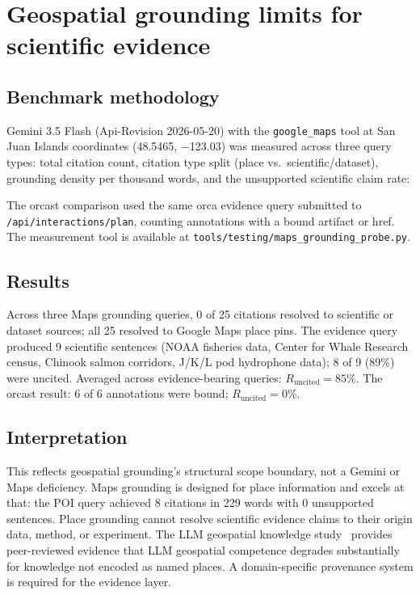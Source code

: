 \section{Geospatial grounding limits for scientific evidence}

\subsection{Benchmark methodology}

Gemini 3.5 Flash (Api-Revision 2026-05-20) with the \texttt{google\_maps} tool at San Juan Islands coordinates (48.5465, $-$123.03) was measured across three query types: total citation count, citation type split (place vs.\ scientific/dataset), grounding density per thousand words, and the unsupported scientific claim rate:

\equncited The orcast comparison used the same orca evidence query submitted to \texttt{/api/interactions/plan}, counting annotations with a bound artifact or href. The measurement tool is available at \texttt{tools/testing/maps\_grounding\_probe.py}.

\subsection{Results}

Across three Maps grounding queries, 0 of 25 citations resolved to scientific or dataset sources; all 25 resolved to Google Maps place pins. The evidence query produced 9 scientific sentences (NOAA fisheries data, Center for Whale Research census, Chinook salmon corridors, J/K/L pod hydrophone data); 8 of 9 (89\%) were uncited. Averaged across evidence-bearing queries: $R_\mathrm{uncited} = 85\%$. The orcast result: 6 of 6 annotations were bound; $R_\mathrm{uncited} = 0\%$.

\subsection{Interpretation}

This reflects geospatial grounding's structural scope boundary, not a Gemini or Maps deficiency. Maps grounding is designed for place information and excels at that: the POI query achieved 8 citations in 229 words with 0 unsupported sentences. Place grounding cannot resolve scientific evidence claims to their origin data, method, or experiment. The LLM geospatial knowledge study~\cite{arxiv231013002} provides peer-reviewed evidence that LLM geospatial competence degrades substantially for knowledge not encoded as named places. A domain-specific provenance system is required for the evidence layer.

